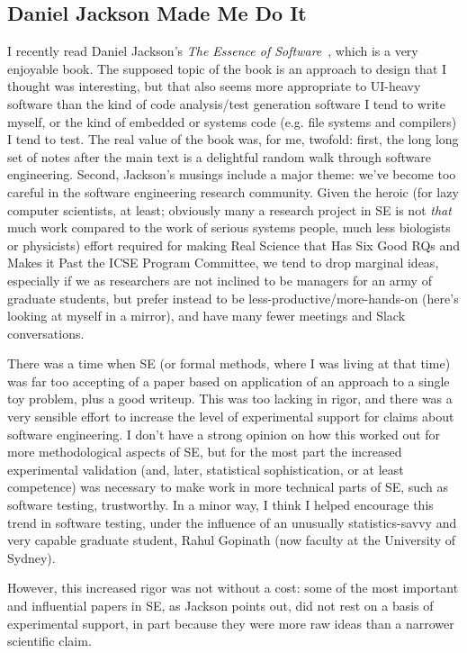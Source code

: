 \documentclass[sigplan,screen]{acmart}
\begin{document}
\subsection{Daniel Jackson Made Me Do It}

I recently read Daniel Jackson's \emph{The Essence of Software}~\cite{essence}, which
is a very enjoyable book.  The supposed topic of the book is an
approach to design that I thought was interesting, but that also seems
more appropriate to UI-heavy software than the
kind of code analysis/test generation software I tend to write
myself, or the kind of embedded or systems code (e.g. file systems and
compilers) I
tend to test.  The real value of the book was, for me, twofold:  first, the
long long set of notes after the main text is a delightful random
walk through software engineering.  Second, Jackson's musings include
a major theme:  we've become too careful in the software engineering
research community.  Given the heroic (for lazy computer scientists,
at least;
obviously many a research project in SE is not \emph{that} much work compared to
the work of serious systems people, much less biologists or
physicists) effort required for making Real Science that Has Six Good
RQs and Makes it Past the ICSE Program Committee, we tend to drop
marginal ideas, especially if we as researchers are not inclined to be
managers for an army of graduate students, but prefer instead to be
less-productive/more-hands-on (here's looking at myself in a mirror),
and have many fewer meetings and Slack conversations.

There was a time
when SE (or formal methods, where I was living at that time) was far
too accepting of a paper based on application of an approach to a
single toy problem, plus a good writeup.  This was too lacking in
rigor, and there was a very sensible effort to increase the level of
experimental support for claims about software engineering.  I don't
have a strong opinion on how this worked out for more methodological
aspects of SE, but for the most part the increased experimental
validation (and, later, statistical sophistication, or at least competence) was necessary to
make work in more technical parts of SE, such as software testing,
trustworthy.  In a minor way, I think I helped encourage this trend in
software testing, under the influence of an unusually
statistics-savvy and very capable graduate student, Rahul Gopinath
(now faculty at the University of Sydney).

However, this increased rigor was not without a cost:  some of the most important and
influential papers in SE, as Jackson points out, did not rest on a
basis of experimental support, in part because they were more raw
ideas than a narrower scientific claim.
\end{document}

